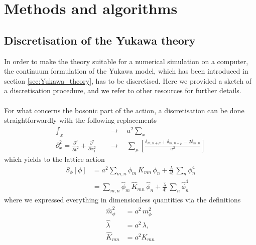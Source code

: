 
\chapter{Methods and algorithms}
\label{chapt:methods}

\section{Discretisation of the Yukawa theory}
\label{sec:lattice_discretisation}
In order to make the theory suitable for a numerical simulation on a computer, the continuum formulation of the Yukawa model, which has been introduced in section \ref{sec:Yukawa_theory}, has to be discretised. Here we provided a sketch of a discretisation procedure, and we refer to other resources \cite{CITATIONS} for further details. \\~\\
For what concerns the bosonic part of the action, a discretisation can be done straightforwardly with the following replacements
\begin{equation*}
    \begin{aligned}
        \int_x \quad &\to \quad a^2 \sum_x \\
        \partial^2_x = \frac{\partial^2}{\partial t^2} + \frac{\partial^2}{\partial x_1^2} \quad &\to \quad \sum_\mu \left[\frac{\delta_{m,n+\mu} + \delta_{m,n-\mu} - 2 \delta_{m,n}}{a^2}\right]
    \end{aligned}
\end{equation*}
which yields to the lattice action
\begin{equation*}
        \begin{aligned} 
        		S_\phi [\phi] 	&=  a^2 \sum_{m,n} \phi_m \, K_{mn} \, \phi_n + \frac{\lambda}{4!} \, \sum_n \phi_n^4 \\
        					&=  \sum_{m,n} \widehat{\phi}_m \, \widehat{K}_{mn} \, \widehat{\phi}_n + \frac{\widehat{\lambda}}{4!} \, \sum_n \widehat{\phi}_n^4
	\end{aligned}
\end{equation*}
where we expressed everything in dimensionless quantities via the definitions
\begin{equation}
    \begin{aligned}
        \hat m_\phi^2 &= a^2 \, m_\phi^2 \\
        \hat \lambda &= a^{2} \, \lambda, \\
        \hat K_{mn} &= a^2 K_{mn}
    \end{aligned}
    \label{eq:couplings_redefitinion}
\end{equation}
